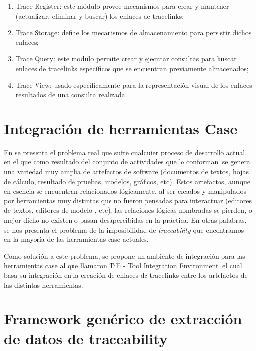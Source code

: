 \documentclass[a4paper,12pt,oneside,spanish]{book}
\begin{document}
\begin{enumerate}
\item Trace Register: este módulo provee mecanismos para crear y mantener (actualizar, eliminar y buscar) los enlaces de tracelinks;
\item Trace Storage: define los mecanismos de almacenamiento para persistir dichos enlaces;
\item Trace Query: este modulo permite crear y ejecutar consultas para buscar enlaces de tracelinks específicos que se encuentran previamente almacenados;
\item Trace View: usado específicamente para la representación visual de los enlaces resultados de una consulta realizada.
\end{enumerate}


\section{Integración de herramientas Case}

En \cite{KlarRoseSchurr} se presenta el problema real que sufre cualquier proceso de desarrollo actual, en el que como resultado del conjunto de actividades que lo conforman, se genera una variedad muy amplia de artefactos de software (documentos de textos, hojas de cálculo, resultado de pruebas, modelos, gráficos, etc). Estos artefactos, aunque en esencia se encuentran relacionados lógicamente, al ser creados y manipulados por herramientas muy distintas que no fueron pensadas para interactuar (editores de textos, editores de modelo , etc), las relaciones lógicas nombradas se pierden, o mejor dicho no existen o pasan desapercibidas en la práctica. En otras palabras, se nos presenta el problema de la imposibilidad de \textit{traceability} que encontramos en la mayoría de las herramientas \gls{case} actuales.

Como solución a este problema, se propone un ambiente de integración para las herramientas \gls{case} al que llamaron TiE - Tool Integration Environment, el cual basa su integración en la creación de enlaces de tracelinks entre los artefactos de las distintas herramientas.

\section{Framework genérico de extracción de datos de traceability}
\end{document}
